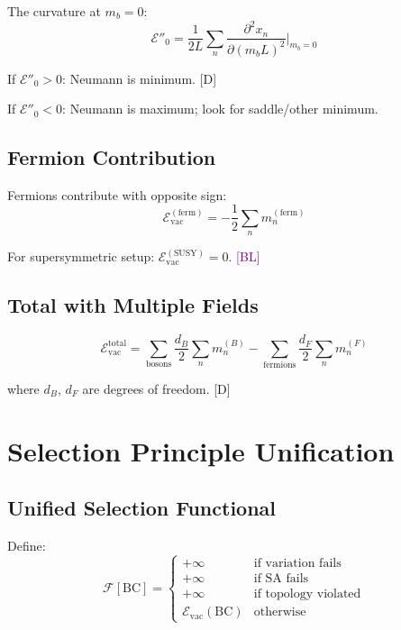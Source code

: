 \documentclass[11pt,a4paper]{article}
\newcommand{\tagD}{\textcolor{blue!70!black}{[D]}}
\newcommand{\tagBL}{\textcolor{purple}{[BL]}}
\begin{document}
The curvature at $m_b = 0$:
\begin{equation}
\label{eq:vac-curv}
\mathcal{E}''_0 = \frac{1}{2L} \sum_n \frac{\partial^2 x_n}{\partial (m_b L)^2}\bigg|_{m_b=0}
\end{equation}

If $\mathcal{E}''_0 > 0$: Neumann is minimum. \tagD

If $\mathcal{E}''_0 < 0$: Neumann is maximum; look for saddle/other minimum.

\subsection{Fermion Contribution}

Fermions contribute with opposite sign:
\begin{equation}
\label{eq:vac-fermion}
\mathcal{E}_{\text{vac}}^{(\text{ferm})} = -\frac{1}{2} \sum_n m_n^{(\text{ferm})}
\end{equation}

For supersymmetric setup: $\mathcal{E}_{\text{vac}}^{(\text{SUSY})} = 0$. \tagBL

\subsection{Total with Multiple Fields}

\begin{equation}
\label{eq:vac-total}
\mathcal{E}_{\text{vac}}^{\text{total}} = \sum_{\text{bosons}} \frac{d_B}{2} \sum_n m_n^{(B)} - \sum_{\text{fermions}} \frac{d_F}{2} \sum_n m_n^{(F)}
\end{equation}

where $d_B$, $d_F$ are degrees of freedom. \tagD

\section{Selection Principle Unification}

\subsection{Unified Selection Functional}

Define:
\begin{equation}
\label{eq:unified-func}
\mathcal{F}[\text{BC}] = \begin{cases}
+\infty & \text{if variation fails} \\
+\infty & \text{if SA fails} \\
+\infty & \text{if topology violated} \\
\mathcal{E}_{\text{vac}}(\text{BC}) & \text{otherwise}
\end{cases}
\end{equation}
\end{document}
